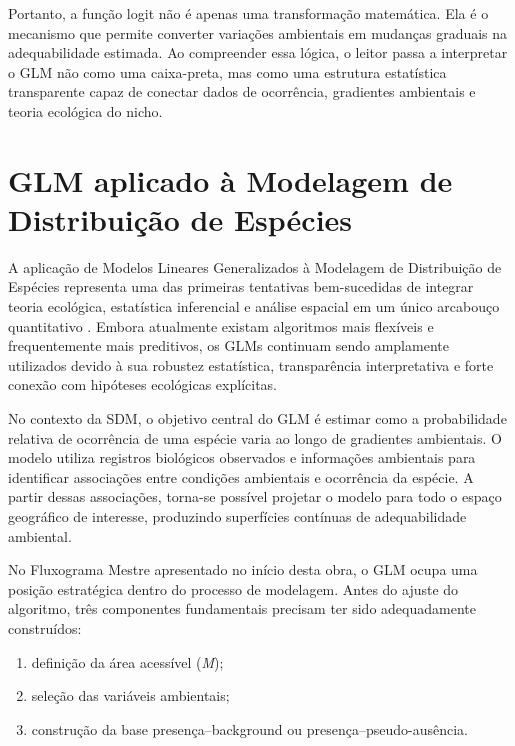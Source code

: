 Portanto, a função logit não é apenas uma transformação matemática. Ela é o mecanismo que permite converter variações ambientais em mudanças graduais na adequabilidade estimada. Ao compreender essa lógica, o leitor passa a interpretar o GLM não como uma caixa-preta, mas como uma estrutura estatística transparente capaz de conectar dados de ocorrência, gradientes ambientais e teoria ecológica do nicho.


\section{GLM aplicado à Modelagem de Distribuição de Espécies}

A aplicação de Modelos Lineares Generalizados à Modelagem de Distribuição de Espécies representa uma das primeiras tentativas bem-sucedidas de integrar teoria ecológica, estatística inferencial e análise espacial em um único arcabouço quantitativo \citep{guisan2000predictive,guisan2002generalized,franklin2010mapping}. Embora atualmente existam algoritmos mais flexíveis e frequentemente mais preditivos, os GLMs continuam sendo amplamente utilizados devido à sua robustez estatística, transparência interpretativa e forte conexão com hipóteses ecológicas explícitas.

No contexto da SDM, o objetivo central do GLM é estimar como a probabilidade relativa de ocorrência de uma espécie varia ao longo de gradientes ambientais. O modelo utiliza registros biológicos observados e informações ambientais para identificar associações entre condições ambientais e ocorrência da espécie. A partir dessas associações, torna-se possível projetar o modelo para todo o espaço geográfico de interesse, produzindo superfícies contínuas de adequabilidade ambiental.

No Fluxograma Mestre apresentado no início desta obra, o GLM ocupa uma posição estratégica dentro do processo de modelagem. Antes do ajuste do algoritmo, três componentes fundamentais precisam ter sido adequadamente construídos:

\begin{enumerate}
	\item definição da área acessível (\textit{M});
	\item seleção das variáveis ambientais;
	\item construção da base presença--background ou presença--pseudo-ausência.
\end{enumerate}

